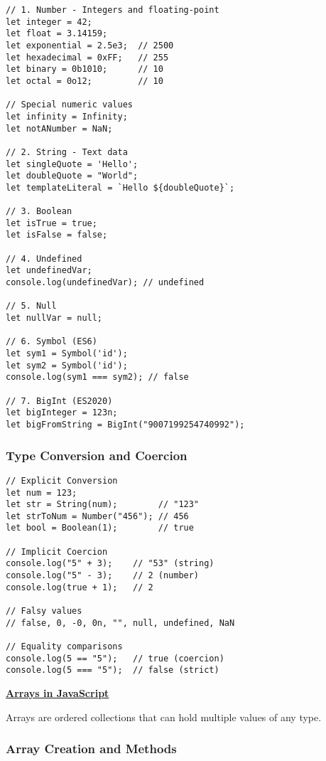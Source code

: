 \documentclass[12pt,a4paper,oneside]{book}
\newcommand{\mysection}[1]{%
    \vspace{0.3em}
    {\large\bfseries\underline{#1}}
    \vspace{0.2em}
    \addcontentsline{toc}{section}{#1}
}
\begin{document}
\begin{lstlisting}[style=javascript, caption={\textbf{All Primitive Data Types}}, label=lst:datatypes]
// 1. Number - Integers and floating-point
let integer = 42;
let float = 3.14159;
let exponential = 2.5e3;  // 2500
let hexadecimal = 0xFF;   // 255
let binary = 0b1010;      // 10
let octal = 0o12;         // 10

// Special numeric values
let infinity = Infinity;
let notANumber = NaN;

// 2. String - Text data
let singleQuote = 'Hello';
let doubleQuote = "World";
let templateLiteral = `Hello ${doubleQuote}`;

// 3. Boolean
let isTrue = true;
let isFalse = false;

// 4. Undefined
let undefinedVar;
console.log(undefinedVar); // undefined

// 5. Null
let nullVar = null;

// 6. Symbol (ES6)
let sym1 = Symbol('id');
let sym2 = Symbol('id');
console.log(sym1 === sym2); // false

// 7. BigInt (ES2020)
let bigInteger = 123n;
let bigFromString = BigInt("9007199254740992");
\end{lstlisting}

\subsubsection{Type Conversion and Coercion}

\begin{lstlisting}[style=javascript, caption={\textbf{Type Conversion and Coercion}}, label=lst:typeconversion]
// Explicit Conversion
let num = 123;
let str = String(num);        // "123"
let strToNum = Number("456"); // 456
let bool = Boolean(1);        // true

// Implicit Coercion
console.log("5" + 3);    // "53" (string)
console.log("5" - 3);    // 2 (number)
console.log(true + 1);   // 2

// Falsy values
// false, 0, -0, 0n, "", null, undefined, NaN

// Equality comparisons
console.log(5 == "5");   // true (coercion)
console.log(5 === "5");  // false (strict)
\end{lstlisting}

\mysection{Arrays in JavaScript}

Arrays are ordered collections that can hold multiple values of any type.

\subsubsection{Array Creation and Methods}
\end{document}
